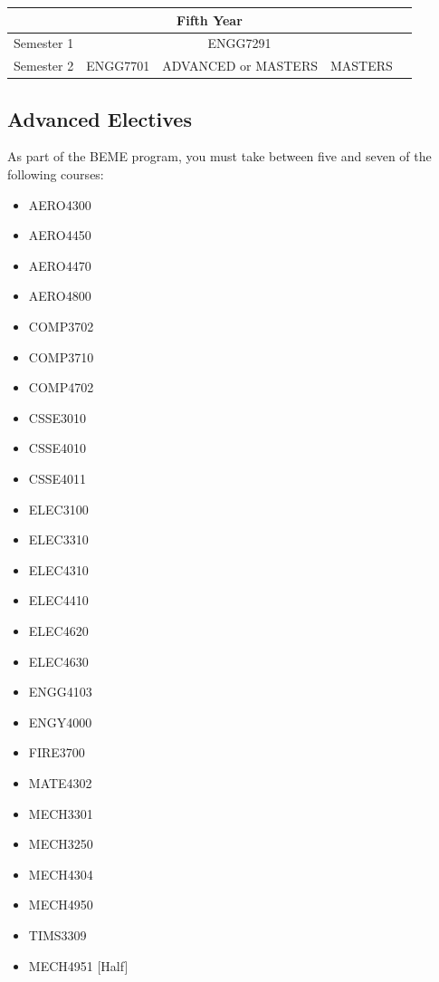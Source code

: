 \documentclass[a4paper,12pt]{report}
\begin{document}
\begin{table}[H]
    \centering
    \begin{tabular}{| m{6em} | m{5em} m{5em} m{5em} m{5em} m{5em} |}
        \hline
        \multicolumn{6}{|c|}{\bfseries Fifth Year} \\
        \hline
        Semester 1 & \multicolumn{4}{c}{ENGG7291} & \\
        Semester 2 & ENGG7701 & \multicolumn{2}{c}{ADVANCED or MASTERS} & MASTERS & \\
        \hline
    \end{tabular}
\end{table}
\renewcommand{\arraystretch}{1}
\newpage

\subsection{Advanced Electives}
As part of the BEME program, you must take between five and seven of the following courses:
\begin{multicols}{3}
    \begin{itemize}
        \item AERO4300
        \item AERO4450
        \item AERO4470
        \item AERO4800
        \item COMP3702
        \item COMP3710
        \item COMP4702
        \item CSSE3010
        \item CSSE4010
        \item CSSE4011
        \item ELEC3100
        \item ELEC3310
        \item ELEC4310
        \item ELEC4410
        \item ELEC4620
        \item ELEC4630
        \item ENGG4103
        \item ENGY4000
        \item FIRE3700
        \item MATE4302
        \item MECH3301
        \item MECH3250
        \item MECH4304
        \item MECH4950
        \item TIMS3309
        \item MECH4951 [Half]
    \end{itemize}
\end{multicols}
\end{document}

